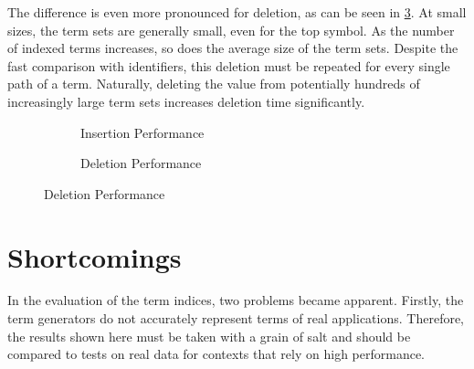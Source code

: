 The difference is even more pronounced for deletion, as can be seen in \cref{delete}. At small sizes, the term sets are generally small, even for the top symbol. As the number of indexed terms increases, so does the average size of the term sets. Despite the fast comparison with identifiers, this deletion must be repeated for every single path of a term. Naturally, deleting the value from potentially hundreds of increasingly large term sets increases deletion time significantly.

\begin{figure}[h]
  \begin{subfigure}{0.45\textwidth}
\begin{adjustbox}{width=1\textwidth}
\end{adjustbox}
\caption{Insertion Performance}
\label{insert}
\end{subfigure}
\begin{subfigure}{0.1\textwidth}
\end{subfigure}
\begin{subfigure}{0.45\textwidth}
\begin{adjustbox}{width=1\textwidth}
\end{adjustbox}
\caption{Deletion Performance}
\label{delete}
\end{subfigure}
\end{figure}

\section{Shortcomings} \label{shortcomings}
In the evaluation of the term indices, two problems became apparent. Firstly, the term generators do not accurately represent terms of real applications. Therefore, the results shown here must be taken with a grain of salt and should be compared to tests on real data for contexts that rely on high performance.

